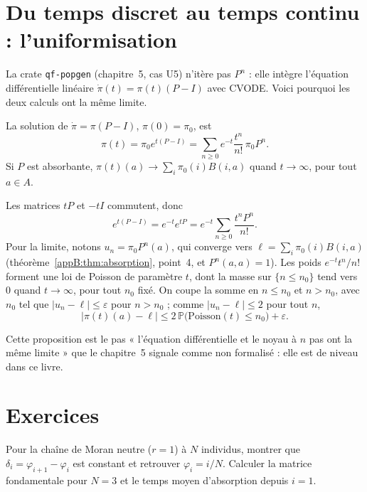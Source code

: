 \section{Du temps discret au temps continu : l'uniformisation}\label{appB:sec:unif}

La crate \texttt{qf-popgen} (chapitre~5, cas U5) n'itère pas $P^n$ : elle intègre l'équation différentielle linéaire
$\dot\pi(t)=\pi(t)(P-I)$ avec CVODE. Voici pourquoi les deux calculs ont la même limite.

\begin{proposition}\label{appB:prop:unif}
La solution de $\dot\pi=\pi(P-I)$, $\pi(0)=\pi_0$, est
\[\pi(t)=\pi_0e^{t(P-I)}=\sum_{n\ge0}e^{-t}\frac{t^n}{n!}\,\pi_0P^n .\]
Si $P$ est absorbante, $\pi(t)(a)\to\sum_i\pi_0(i)B(i,a)$ quand $t\to\infty$, pour tout $a\in A$.
\end{proposition}

\begin{humanproof}
Les matrices $tP$ et $-tI$ commutent, donc
\[e^{t(P-I)}=e^{-t}e^{tP}=e^{-t}\sum_{n\ge0}\frac{t^nP^n}{n!} .\]
Pour la limite, notons
$u_n=\pi_0P^n(a)$, qui converge vers $\ell=\sum_i\pi_0(i)B(i,a)$ (théorème~\ref{appB:thm:absorption}, point~4, et
$P^n(a,a)=1$). Les poids $e^{-t}t^n/n!$ forment une loi de Poisson de paramètre $t$, dont la masse sur $\{n\le n_0\}$
tend vers $0$ quand $t\to\infty$, pour tout $n_0$ fixé. On coupe la somme en $n\le n_0$ et $n>n_0$, avec $n_0$ tel que
$|u_n-\ell|\le\varepsilon$ pour $n>n_0$ ; comme $|u_n-\ell|\le2$ pour tout $n$,
\[|\pi(t)(a)-\ell|\le2\,\mathbb P\bigl(\mathrm{Poisson}(t)\le n_0\bigr)+\varepsilon .\]
\end{humanproof}
Cette proposition est le pas « l'équation différentielle et le noyau à $n$ pas ont la même limite » que le chapitre~5
signale comme non formalisé : elle est de niveau \tierC{} dans ce livre.

\section{Exercices}\label{appB:sec:exos}

\begin{exercise}
Pour la chaîne de Moran neutre ($r=1$) à $N$ individus, montrer que $\delta_i=\varphi_{i+1}-\varphi_i$ est constant et
retrouver $\varphi_i=i/N$. Calculer la matrice fondamentale pour $N=3$ et le temps moyen d'absorption depuis $i=1$.
\end{exercise}

